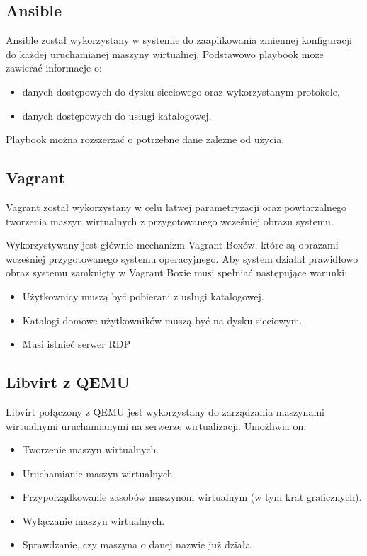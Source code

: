\documentclass[../opis-rozwiazania.tex]{subfiles}
\begin{document}
\subsection{Ansible}
Ansible został wykorzystany w systemie do zaaplikowania zmiennej konfiguracji do każdej uruchamianej maszyny wirtualnej.
Podstawowo playbook może zawierać informacje o:
\begin{itemize}
  \item danych dostępowych do dysku sieciowego oraz wykorzystanym protokole,
  \item danych dostępowych do usługi katalogowej.
\end{itemize}
Playbook można rozszerzać o potrzebne dane zależne od użycia.

\subsection{Vagrant}
Vagrant został wykorzystany w celu łatwej parametryzacji oraz powtarzalnego tworzenia maszyn wirtualnych z przygotowanego wcześniej obrazu systemu.

Wykorzystywany jest głównie mechanizm Vagrant Boxów, które są obrazami wcześniej przygotowanego systemu operacyjnego.
Aby system działał prawidłowo obraz systemu zamknięty w Vagrant Boxie musi spełniać następujące warunki:
\begin{itemize}
  \item Użytkownicy muszą być pobierani z usługi katalogowej.
  \item Katalogi domowe użytkowników muszą być na dysku sieciowym.
  \item Musi istnieć serwer RDP
\end{itemize}

\subsection{Libvirt z QEMU}
Libvirt połączony z QEMU jest wykorzystany do zarządzania maszynami wirtualnymi uruchamianymi na serwerze wirtualizacji.
Umożliwia on:
\begin{itemize}
  \item Tworzenie maszyn wirtualnych.
  \item Uruchamianie maszyn wirtualnych.
  \item Przyporządkowanie zasobów maszynom wirtualnym (w tym krat graficznych).
  \item Wyłączanie maszyn wirtualnych.
  \item Sprawdzanie, czy maszyna o danej nazwie już działa.
\end{itemize}
\end{document}

